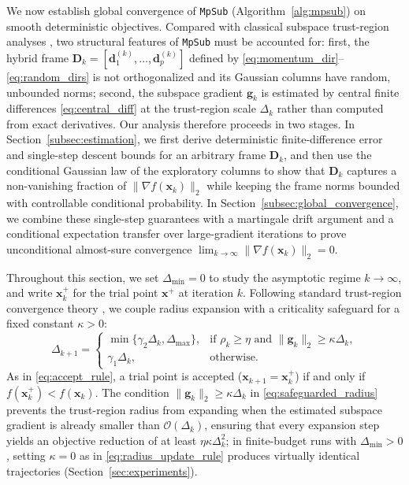 \documentclass[smallextended]{svjour3}
\newcommand{\bx}{\bm{x}}
\newcommand{\bd}{\bm{d}}
\newcommand{\bg}{\bm{g}}
\begin{document}
We now establish global convergence of \texttt{MpSub} (Algorithm~\ref{alg:mpsub}) on smooth deterministic objectives. Compared with classical subspace trust-region analyses \cite{cartis2023scalable,cartis2024randomizedsubspacederivativefreeoptimization}, two structural features of \texttt{MpSub} must be accounted for: first, the hybrid frame $\bm D_k = [\bd_1^{(k)}, \ldots, \bd_p^{(k)}]$ defined by \eqref{eq:momentum_dir}--\eqref{eq:random_dirs} is not orthogonalized and its Gaussian columns have random, unbounded norms; second, the subspace gradient $\bg_k$ is estimated by central finite differences \eqref{eq:central_diff} at the trust-region scale $\Delta_k$ rather than computed from exact derivatives. Our analysis therefore proceeds in two stages. In Section~\ref{subsec:estimation}, we first derive deterministic finite-difference error and single-step descent bounds for an arbitrary frame $\bm D_k$, and then use the conditional Gaussian law of the exploratory columns to show that $\bm D_k$ captures a non-vanishing fraction of $\|\nabla f(\bx_k)\|_2$ while keeping the frame norms bounded with controllable conditional probability. In Section~\ref{subsec:global_convergence}, we combine these single-step guarantees with a martingale drift argument and a conditional expectation transfer over large-gradient iterations to prove unconditional almost-sure convergence $\lim_{k\to\infty}\|\nabla f(\bx_k)\|_2 = 0$.

Throughout this section, we set $\Delta_{\min}=0$ to study the asymptotic regime $k\to\infty$, and write $\bx_k^+$ for the trial point $\bx^+$ at iteration $k$. Following standard trust-region convergence theory \cite{conn2009introduction}, we couple radius expansion with a criticality safeguard for a fixed constant $\kappa>0$:
\begin{equation}
\label{eq:safeguarded_radius}
\Delta_{k+1} =
\begin{cases}
\min\{\gamma_2\Delta_k,\Delta_{\max}\}, & \text{if } \rho_k\ge\eta \text{ and } \|\bg_k\|_2\ge\kappa\Delta_k, \\
\gamma_1\Delta_k, & \text{otherwise}.
\end{cases}
\end{equation}
As in \eqref{eq:accept_rule}, a trial point is accepted ($\bx_{k+1} = \bx_k^+$) if and only if $f(\bx_k^+) < f(\bx_k)$. The condition $\|\bg_k\|_2 \ge \kappa\Delta_k$ in \eqref{eq:safeguarded_radius} prevents the trust-region radius from expanding when the estimated subspace gradient is already smaller than $\mathcal{O}(\Delta_k)$, ensuring that every expansion step yields an objective reduction of at least $\eta\kappa\Delta_k^2$; in finite-budget runs with $\Delta_{\min}>0$, setting $\kappa=0$ as in \eqref{eq:radius_update_rule} produces virtually identical trajectories (Section~\ref{sec:experiments}).
\end{document}
